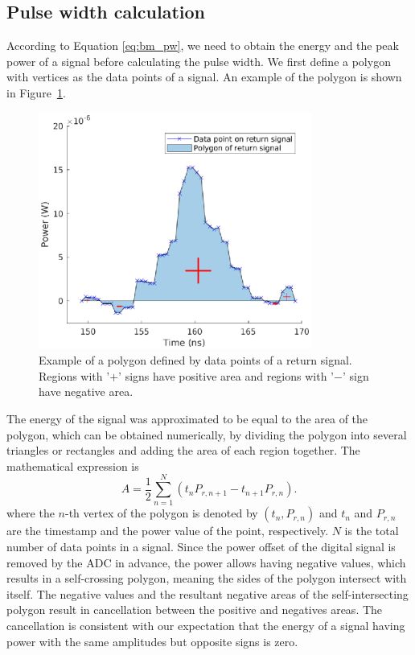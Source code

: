 \subsection{Pulse width calculation} \label{sec:bm_pw_cal}
According to Equation \eqref{eq:bm_pw}, we need to obtain the energy and the peak power of a signal before calculating the pulse width. We first define a polygon with vertices as the data points of a signal. An example of the polygon is shown in Figure~\ref{fig:bm_polygon}. 
\begin{figure}[htb] %
\centering
\graphicspath{ {figures/} }
\includegraphics[width=0.8\textwidth]{figures/chapter6_ADC/polygon.eps}
\caption{Example of a polygon defined by data points of a return signal. Regions with '$+$' signs have positive area and regions with '$-$' sign have negative area.}
\label{fig:bm_polygon}
\end{figure}
The energy of the signal was approximated to be equal to the area of the polygon, which can be obtained numerically, by dividing the polygon into several triangles or rectangles and adding the area of each region together\citep{bourke1988calculating}. The mathematical expression is
\begin{equation}\label{eq:area} %
    A=\frac{1}{2}\sum\limits_{n=1}^{N}(t_nP_{r,n+1}-t_{n+1}P_{r,n}).
\end{equation}
where the $n$-th vertex of the polygon is denoted by $(t_n, P_{r,n})$ and $t_n$ and $P_{r,n}$ are the timestamp and the power value of the point, respectively. $N$ is the total number of data points in a signal. Since the power offset of the digital signal is removed by the ADC in advance, the power allows having negative values, which results in a self-crossing polygon, meaning the sides of the polygon intersect with itself. The negative values and the resultant negative areas of the self-intersecting polygon result in cancellation between the positive and negatives areas. The cancellation is consistent with our expectation that the energy of a signal having power with the same amplitudes but opposite signs is zero.\par
